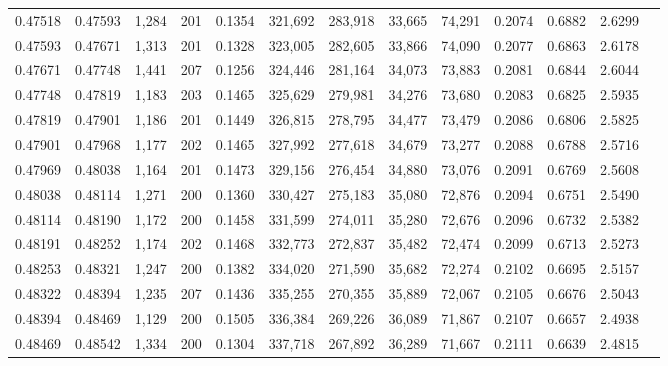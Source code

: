 \begin{tabular}{rrrrrrrrrrrrr}
0.47518 & 0.47593 & 1,284 & 201 &                                     0.1354 & 321,692 & 283,918 &  33,665 &  74,291 & 0.2074 & 0.6882 & 2.6299 \\
0.47593 & 0.47671 & 1,313 & 201 &                                     0.1328 & 323,005 & 282,605 &  33,866 &  74,090 & 0.2077 & 0.6863 & 2.6178 \\
0.47671 & 0.47748 & 1,441 & 207 &                                     0.1256 & 324,446 & 281,164 &  34,073 &  73,883 & 0.2081 & 0.6844 & 2.6044 \\
0.47748 & 0.47819 & 1,183 & 203 &                                     0.1465 & 325,629 & 279,981 &  34,276 &  73,680 & 0.2083 & 0.6825 & 2.5935 \\
0.47819 & 0.47901 & 1,186 & 201 &                                     0.1449 & 326,815 & 278,795 &  34,477 &  73,479 & 0.2086 & 0.6806 & 2.5825 \\
0.47901 & 0.47968 & 1,177 & 202 &                                     0.1465 & 327,992 & 277,618 &  34,679 &  73,277 & 0.2088 & 0.6788 & 2.5716 \\
0.47969 & 0.48038 & 1,164 & 201 &                                     0.1473 & 329,156 & 276,454 &  34,880 &  73,076 & 0.2091 & 0.6769 & 2.5608 \\
0.48038 & 0.48114 & 1,271 & 200 &                                     0.1360 & 330,427 & 275,183 &  35,080 &  72,876 & 0.2094 & 0.6751 & 2.5490 \\
0.48114 & 0.48190 & 1,172 & 200 &                                     0.1458 & 331,599 & 274,011 &  35,280 &  72,676 & 0.2096 & 0.6732 & 2.5382 \\
0.48191 & 0.48252 & 1,174 & 202 &                                     0.1468 & 332,773 & 272,837 &  35,482 &  72,474 & 0.2099 & 0.6713 & 2.5273 \\
0.48253 & 0.48321 & 1,247 & 200 &                                     0.1382 & 334,020 & 271,590 &  35,682 &  72,274 & 0.2102 & 0.6695 & 2.5157 \\
0.48322 & 0.48394 & 1,235 & 207 &                                     0.1436 & 335,255 & 270,355 &  35,889 &  72,067 & 0.2105 & 0.6676 & 2.5043 \\
0.48394 & 0.48469 & 1,129 & 200 &                                     0.1505 & 336,384 & 269,226 &  36,089 &  71,867 & 0.2107 & 0.6657 & 2.4938 \\
0.48469 & 0.48542 & 1,334 & 200 &                                     0.1304 & 337,718 & 267,892 &  36,289 &  71,667 & 0.2111 & 0.6639 & 2.4815 \\

\end{tabular}
